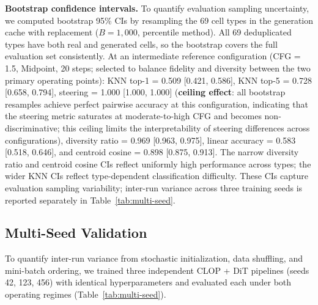 \documentclass[preprint,12pt]{elsarticle}
\begin{document}
\textbf{Bootstrap confidence intervals.} To quantify evaluation sampling uncertainty, we computed bootstrap 95\% CIs by resampling the 69 cell types in the generation cache with replacement ($B{=}1{,}000$, percentile method). All 69 deduplicated types have both real and generated cells, so the bootstrap covers the full evaluation set consistently. At an intermediate reference configuration (CFG = 1.5, Midpoint, 20 steps; selected to balance fidelity and diversity between the two primary operating points): KNN top-1 = 0.509 [0.421, 0.586], KNN top-5 = 0.728 [0.658, 0.794], steering = 1.000 [1.000, 1.000] (\textbf{ceiling effect}: all bootstrap resamples achieve perfect pairwise accuracy at this configuration, indicating that the steering metric saturates at moderate-to-high CFG and becomes non-discriminative; this ceiling limits the interpretability of steering differences across configurations), diversity ratio = 0.969 [0.963, 0.975], linear accuracy = 0.583 [0.518, 0.646], and centroid cosine = 0.898 [0.875, 0.913]. The narrow diversity ratio and centroid cosine CIs reflect uniformly high performance across types; the wider KNN CIs reflect type-dependent classification difficulty. These CIs capture evaluation sampling variability; inter-run variance across three training seeds is reported separately in Table~\ref{tab:multi-seed}.

\subsection{Multi-Seed Validation}\label{sec:multi-seed-results}

To quantify inter-run variance from stochastic initialization, data shuffling, and mini-batch ordering, we trained three independent CLOP + DiT pipelines (seeds 42, 123, 456) with identical hyperparameters and evaluated each under both operating regimes (Table~\ref{tab:multi-seed}).
\end{document}
